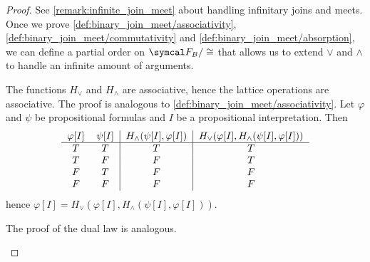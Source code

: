 \begin{proof}
  See \cref{remark:infinite_join_meet} about handling infinitary joins and meets. Once we prove \ref{def:binary_join_meet/associativity}, \ref{def:binary_join_meet/commutativity} and \ref{def:binary_join_meet/absorption}, we can define a partial order on \( \Cal{F}_B / \cong \) that allows us to extend \( \lor \) and \( \land \) to handle an infinite amount of arguments.

  \begin{description}
     The functions \( H_\lor \) and \( H_\land \) are associative, hence the lattice operations are associative.
     The proof is analogous to \ref{def:binary_join_meet/associativity}.
     Let \( \varphi \) and \( \psi \) be propositional formulas and \( I \) be a propositional interpretation. Then
    \begin{equation*}
      \begin{tabular}{c c | c | c}
        \( \varphi[I] \) & \( \psi[I] \) & \( H_\land(\psi[I], \varphi[I]) \) & \( H_\lor(\varphi[I], H_\land(\psi[I], \varphi[I])) \) \\
        \hline
        \( T \)          & \( T \)       & \( T \)                            & \( T \)    \\
        \( T \)          & \( F \)       & \( F \)                            & \( T \)    \\
        \( F \)          & \( T \)       & \( F \)                            & \( F \)    \\
        \( F \)          & \( F \)       & \( F \)                            & \( F \)
      \end{tabular}
    \end{equation*}
    hence \( \varphi[I] = H_\lor(\varphi[I], H_\land(\psi[I], \varphi[I])) \).

    The proof of the dual law is analogous.


\end{description}
\end{proof}
